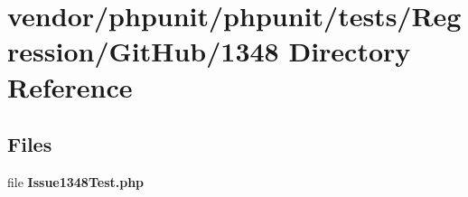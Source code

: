 \section{vendor/phpunit/phpunit/tests/\+Regression/\+Git\+Hub/1348 Directory Reference}
\label{dir_4536f4db17ada5211934c98b5ce21f60}
\subsection*{Files}
\begin{DoxyCompactItemize}
\item 
file {\bf Issue1348\+Test.\+php}
\end{DoxyCompactItemize}
